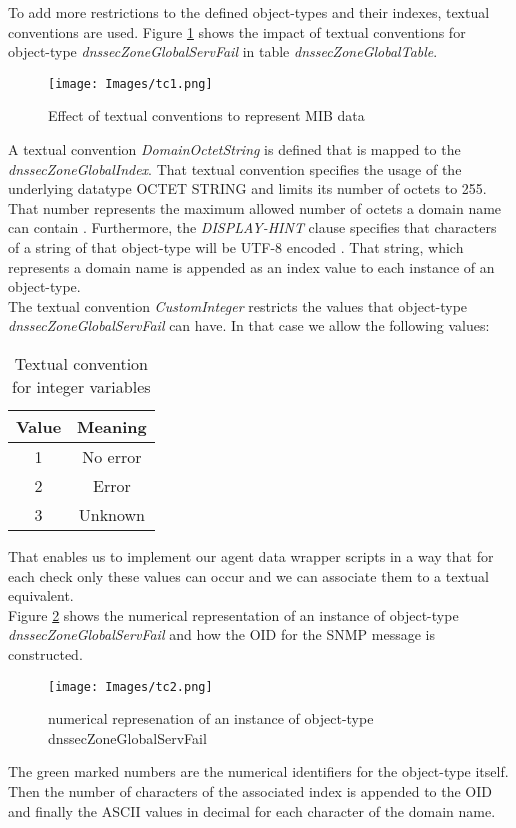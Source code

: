 To add more restrictions to the defined object-types and their indexes, textual conventions are used. Figure \ref{figure:textual-conventions} shows the impact of textual conventions for object-type \textit{dnssecZoneGlobalServFail} in table \textit{dnssecZoneGlobalTable}.    

\begin{figure}[H]
\centering
\texttt{[image: Images/tc1.png]}
\caption{Effect of textual conventions to represent MIB data}
\label{figure:textual-conventions}
\end{figure}

A textual convention \textit{DomainOctetString} is defined that is mapped to the \textit{dnssecZoneGlobalIndex}. That textual convention specifies the usage of the underlying datatype OCTET STRING and limits its number of octets to 255. That number represents the maximum allowed number of octets a domain name can contain \cite{wiki-domainnames}. Furthermore, the \textit{DISPLAY-HINT} clause specifies that characters of a string of that object-type will be UTF-8 encoded \cite{smi-tc}. That string, which represents a domain name is appended as an index value to each instance of an object-type.
\\ 
The textual convention \textit{CustomInteger} restricts the values that object-type \textit{dnssecZoneGlobalServFail} can have. In that case we allow the following values:

\begin{table}[h]
   \centering
  \begin{tabular}{|c|c|}
  \hline
  Value & Meaning \\
  \hline
  1 & No error \\
  2 & Error \\
  3 & Unknown \\  
  \hline
\end{tabular} 
\caption{Textual convention for integer variables }
\label{table}
\end{table}



That enables us to implement our agent data wrapper scripts in a way that for each check only these values can occur and we can associate them to a textual equivalent. 
\\
Figure \ref{figure:textual-conventions2} shows the numerical representation of an instance of object-type \textit{dnssecZoneGlobalServFail} and how the OID for the SNMP message is constructed.

\begin{figure}[H]
\centering
\texttt{[image: Images/tc2.png]}
\caption{numerical represenation of an instance of object-type dnssecZoneGlobalServFail}
\label{figure:textual-conventions2}
\end{figure}

The green marked numbers are the numerical identifiers for the object-type itself. Then the number of characters of the associated index is appended to the OID and finally the ASCII values in decimal for each character of the domain name.  